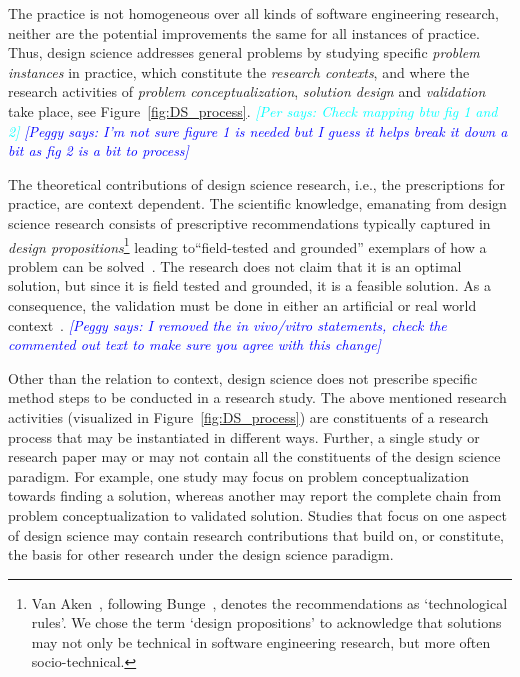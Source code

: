 \documentclass[graybox]{svmult}
\newcommand{\emelie}[1]{\textcolor{red}{{\it [Emelie says: #1]}}}
\newcommand{\peggy}[1]{\textcolor{blue}{{\it [Peggy says: #1]}}}
\newcommand{\per}[1]{\textcolor{cyan}{{\it [Per says: #1]}}}
\newcommand{\emelie}[1]{}
\newcommand{\peggy}[1]{}
\newcommand{\per}[1]{}
\begin{document}
The practice is not homogeneous over all kinds of software engineering research, neither are the potential improvements the same for all instances of practice. Thus, design science addresses general problems by studying specific \emph{problem instances} in practice, which constitute the \emph{research contexts}, and where the research activities of \emph{problem conceptualization}, \emph{solution design} and \emph{validation} take place, see Figure~\ref{fig:DS_process}. \per{Check mapping btw fig 1 and 2}
\peggy{I'm not sure figure 1 is needed but I guess it helps break it down a bit as fig 2 is a bit to process}


The theoretical contributions of design science research, i.e., the prescriptions for practice, are context dependent. The scientific knowledge, emanating from design science research consists of prescriptive recommendations typically captured in \emph{design propositions}\footnote{Van Aken~\cite{van_aken_management_2004}, following Bunge~\cite{bunge_philosophy_1998}, denotes the recommendations as `technological rules'. We chose the term `design propositions' to acknowledge that solutions may not only be technical in software engineering research, but more often socio-technical.} leading to``field-tested and grounded'' exemplars of how a problem can be solved~\cite{van_aken_management_2004}. The research does not claim that it is an optimal solution, but since it is field tested and grounded, it is a feasible solution.
As a consequence, the validation must be done in either an artificial or real world context~\cite{wieringa_what_2014}.  
\peggy{I removed the in vivo/vitro statements, check the commented out text to make sure you agree with this change}

Other than the relation to context, design science does not prescribe specific method steps to be conducted in a research study. The above mentioned research activities (visualized in Figure~\ref{fig:DS_process}) are constituents of a research process that may be instantiated in different ways. 
Further, a single study or research paper may or may not contain all the constituents of the design science paradigm. For example, one study may focus on problem conceptualization towards finding a solution, whereas another may report the complete chain from problem conceptualization to validated solution. Studies that focus on one aspect of design science may contain research contributions that build on, or constitute, the basis for other research under the design science paradigm.
\end{document}
